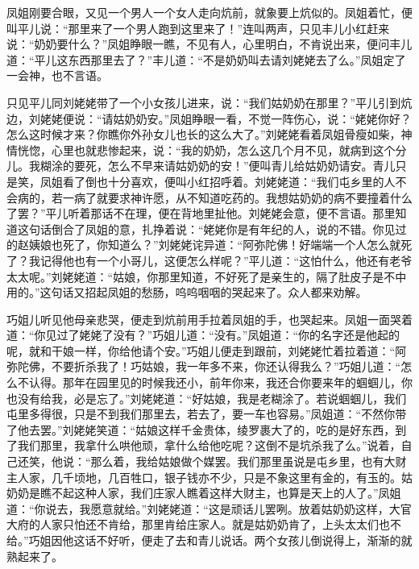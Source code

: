 \begin{parag}
    凤姐刚要合眼，又见一个男人一个女人走向炕前，就象要上炕似的。凤姐着忙，便叫平儿说：“那里来了一个男人跑到这里来了！”连叫两声，只见丰儿小红赶来说：“奶奶要什么？”凤姐睁眼一瞧，不见有人，心里明白，不肯说出来，便问丰儿道：“平儿这东西那里去了？”丰儿道：“不是奶奶叫去请刘姥姥去了么。”凤姐定了一会神，也不言语。
\end{parag}


\begin{parag}
    只见平儿同刘姥姥带了一个小女孩儿进来，说：“我们姑奶奶在那里？”平儿引到炕边，刘姥姥便说：“请姑奶奶安。”凤姐睁眼一看，不觉一阵伤心，说：“姥姥你好？怎么这时候才来？你瞧你外孙女儿也长的这么大了。”刘姥姥看着凤姐骨瘦如柴，神情恍惚，心里也就悲惨起来，说：“我的奶奶，怎么这几个月不见，就病到这个分儿。我糊涂的要死，怎么不早来请姑奶奶的安！”便叫青儿给姑奶奶请安。青儿只是笑，凤姐看了倒也十分喜欢，便叫小红招呼着。刘姥姥道：“我们屯乡里的人不会病的，若一病了就要求神许愿，从不知道吃药的。我想姑奶奶的病不要撞着什么了罢？”平儿听着那话不在理，便在背地里扯他。刘姥姥会意，便不言语。那里知道这句话倒合了凤姐的意，扎挣着说：“姥姥你是有年纪的人，说的不错。你见过的赵姨娘也死了，你知道么？”刘姥姥诧异道：“阿弥陀佛！好端端一个人怎么就死了？我记得他也有一个小哥儿，这便怎么样呢？”平儿道：“这怕什么，他还有老爷太太呢。”刘姥姥道：“姑娘，你那里知道，不好死了是亲生的，隔了肚皮子是不中用的。”这句话又招起凤姐的愁肠，呜呜咽咽的哭起来了。众人都来劝解。
\end{parag}


\begin{parag}
    巧姐儿听见他母亲悲哭，便走到炕前用手拉着凤姐的手，也哭起来。凤姐一面哭着道：“你见过了姥姥了没有？”巧姐儿道：“没有。”凤姐道：“你的名字还是他起的呢，就和干娘一样，你给他请个安。”巧姐儿便走到跟前，刘姥姥忙着拉着道：“阿弥陀佛，不要折杀我了！巧姑娘，我一年多不来，你还认得我么？”巧姐儿道：“怎么不认得。那年在园里见的时候我还小，前年你来，我还合你要来年的蝈蝈儿，你也没有给我，必是忘了。”刘姥姥道：“好姑娘，我是老糊涂了。若说蝈蝈儿，我们屯里多得很，只是不到我们那里去，若去了，要一车也容易。”凤姐道：“不然你带了他去罢。”刘姥姥笑道：“姑娘这样千金贵体，绫罗裹大了的，吃的是好东西，到了我们那里，我拿什么哄他顽，拿什么给他吃呢？这倒不是坑杀我了么。”说着，自己还笑，他说：“那么着，我给姑娘做个媒罢。我们那里虽说是屯乡里，也有大财主人家，几千顷地，几百牲口，银子钱亦不少，只是不象这里有金的，有玉的。姑奶奶是瞧不起这种人家，我们庄家人瞧着这样大财主，也算是天上的人了。”凤姐道：“你说去，我愿意就给。”刘姥姥道：“这是顽话儿罢咧。放着姑奶奶这样，大官大府的人家只怕还不肯给，那里肯给庄家人。就是姑奶奶肯了，上头太太们也不给。”巧姐因他这话不好听，便走了去和青儿说话。两个女孩儿倒说得上，渐渐的就熟起来了。
\end{parag}


